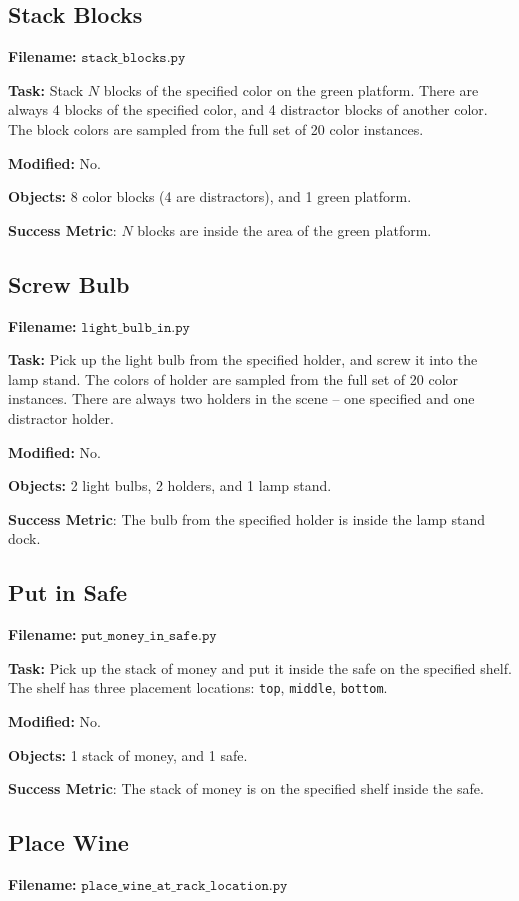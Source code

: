 \documentclass{article}
\begin{document}
\subsection{Stack Blocks}
\textbf{Filename:} $\texttt{stack\_blocks.py}$ 

\textbf{Task:} Stack $N$ blocks of the specified color on the green platform. There are always 4 blocks of the specified color, and 4 distractor blocks of another color. The block colors are sampled from the full set of 20 color instances. 

\textbf{Modified:} No.

\textbf{Objects:} 8 color blocks (4 are distractors), and 1 green platform.

\textbf{Success Metric}: $N$ blocks are inside the area of the green platform. 

\subsection{Screw Bulb}
\textbf{Filename:} $\texttt{light\_bulb\_in.py}$ 

\textbf{Task:} Pick up the light bulb from the specified holder, and screw it into the lamp stand. The colors of holder are sampled from the full set of 20 color instances. There are always two holders in the scene -- one specified and one distractor holder. 

\textbf{Modified:} No.

\textbf{Objects:} 2 light bulbs, 2 holders, and 1 lamp stand.

\textbf{Success Metric}: The bulb from the specified holder is inside the lamp stand dock. 

\subsection{Put in Safe}
\textbf{Filename:} $\texttt{put\_money\_in\_safe.py}$ 

\textbf{Task:} Pick up the stack of money and put it inside the safe on the specified shelf. The shelf has three placement locations: \texttt{top}, \texttt{middle}, \texttt{bottom}. 

\textbf{Modified:} No.

\textbf{Objects:} 1 stack of money, and 1 safe. 

\textbf{Success Metric}: The stack of money is on the specified shelf inside the safe. 

\subsection{Place Wine}
\textbf{Filename:} $\texttt{place\_wine\_at\_rack\_location.py}$ 
\end{document}
